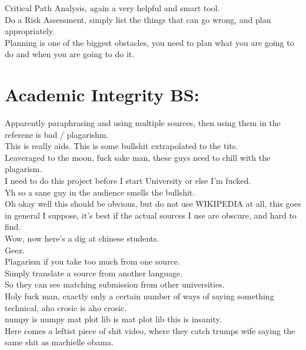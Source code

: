 \documentclass [12pt]{article}
\begin{document}
Critical Path Analysis, again a very helpful and smart tool.\\ 

Do a Risk Assessment, simply list the things that can go wrong, and plan appropriately.\\


Planning is one of the biggest obstacles, you need to plan what you are going to do and when you are going to do it.\\ 


\section{Academic Integrity BS:}

Apparently paraphrasing and using multiple sources, then using them in the referene is bad / plagarishm.\\ This is really aids. This is some bullshit extrapolated to the tits.\\ 

Leaveraged to the moon, fuck sake man, these guys need to chill with the plagarism.\\ 

I need to do this project before I start University or else I'm fucked.\\ 

 Yh so a sane guy in the audience smells the bullshit.\\ 

Oh okay well this should be obvious, but do not use WIKIPEDIA at all, this goes in general I suppose, it's best if the actual sources I use are obscure, and hard to find.\\ 

Wow, now here's a dig at chinese students.\\ 
Geez.\\

Plagarism if you take too much from one source.\\
Simply translate a source from another language.\\ 
So they can see matching submission from other universities.\\ 
Holy fuck man, exactly only a certain number of ways of saying something technical, aho crosic is aho crosic.\\

numpy is numpy mat plot lib is mat plot lib this is insanity.\\ 


Here comes a leftist piece of shit video, where they catch trumps wife saying the same shit as machielle obama.\\ 
\end{document}
